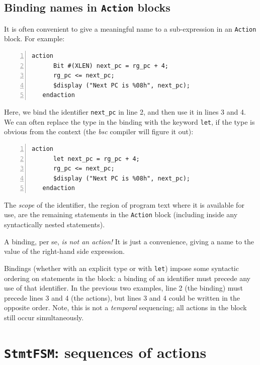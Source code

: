 
\subsection{Binding names in {\tt Action} blocks}


It is often convenient to give a meaningful name to a sub-expression
in an {\tt Action} block.  For example:

{\footnotesize
\begin{Verbatim}[frame=single, numbers=left]
   action
      Bit #(XLEN) next_pc = rg_pc + 4;
      rg_pc <= next_pc;
      $display ("Next PC is %08h", next_pc);
   endaction
\end{Verbatim}
}

Here, we bind the identifier \verb|next_pc| in line 2, and then use it
in lines 3 and 4.  We can often replace the type in the binding with
the keyword {\tt let}, if the type is obvious from the context (the
\emph{bsc} compiler will figure it out):

{\footnotesize
\begin{Verbatim}[frame=single, numbers=left]
   action
      let next_pc = rg_pc + 4;
      rg_pc <= next_pc;
      $display ("Next PC is %08h", next_pc);
   endaction
\end{Verbatim}
}

The \emph{scope} of the identifier, {\ie} the region of program text
where it is available for use, are the remaining statements in the
{\tt Action} block (including inside any syntactically nested
statements).

A binding, per se, \emph{is not an action!}  It is just a convenience,
giving a name to the value of the right-hand side expression.

Bindings (whether with an explicit type or with \verb|let|) impose
some syntactic ordering on statements in the block: a binding of an
identifier must precede any use of that identifier.  In the previous
two examples, line 2 (the binding) must precede lines 3 and 4 (the
actions), but lines 3 and 4 could be written in the opposite order.
Note, this is not a \emph{temporal} sequencing; all actions in the
block still occur simultaneously.


\section{{\tt StmtFSM}: sequences of actions}

